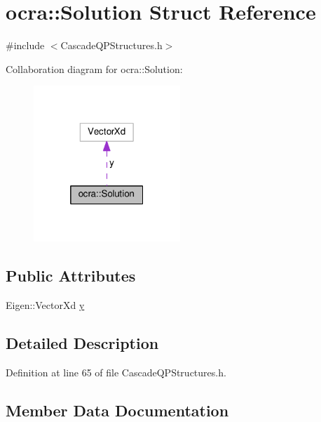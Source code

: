 \hypertarget{structocra_1_1Solution}{}\section{ocra\+:\+:Solution Struct Reference}
\label{structocra_1_1Solution}


{\ttfamily \#include $<$Cascade\+Q\+P\+Structures.\+h$>$}



Collaboration diagram for ocra\+:\+:Solution\+:
\nopagebreak
\begin{figure}[H]
\begin{center}
\leavevmode
\includegraphics[width=157pt]{da/d1c/structocra_1_1Solution__coll__graph}
\end{center}
\end{figure}
\subsection*{Public Attributes}
\begin{DoxyCompactItemize}
\item 
Eigen\+::\+Vector\+Xd \hyperlink{structocra_1_1Solution_a1b80abc6ec96a3245cf3813c20f417f9}{y}
\end{DoxyCompactItemize}


\subsection{Detailed Description}


Definition at line 65 of file Cascade\+Q\+P\+Structures.\+h.



\subsection{Member Data Documentation}
